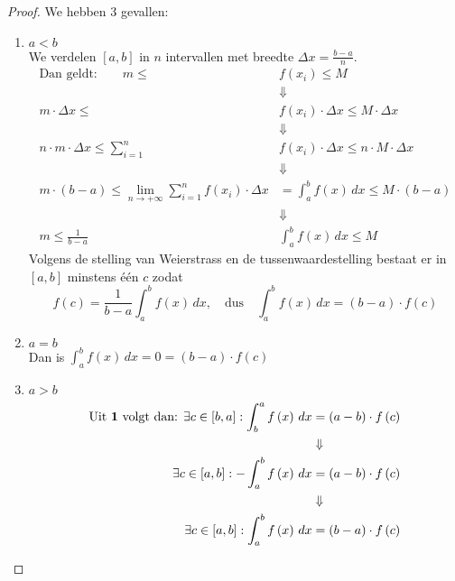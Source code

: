 \documentclass{article}
\theoremstyle{definition}
\begin{document}
\begin{proof}
  We hebben 3 gevallen:
  \begin{enumerate}
    \item $\boxed{a<b}$\\
      We verdelen $\left[a,b\right]$ in $n$ intervallen met breedte $\Delta x = \frac{b-a}{n}$.\\
      \begin{align*}
        \text{Dan geldt:}\qquad m\leq &f\left(x_i\right) \leq M\\
                          &\Downarrow\\
        m \cdot \Delta x\leq &f\left(x_i\right)\cdot \Delta x \leq M\cdot \Delta x\\ 
                          &\Downarrow\\
        n\cdot m \cdot \Delta x\leq \sum_{i=1}^{n}&f\left(x_i\right)\cdot \Delta x \leq n\cdot M\cdot \Delta x\\
                          &\Downarrow\\
        m\cdot \left(b-a\right)\leq \lim_{n\to + \infty}\sum_{i=1}^{n}f\left(x_i\right)\cdot \Delta x &=\displaystyle\int_{a}^{b}f\left(x\right)\,dx\leq M\cdot \left(b-a\right)\\
                          &\Downarrow\\
        m\leq\frac{1}{b-a}&\displaystyle\int_{a}^{b}f\left(x\right)\,dx\leq M
      \end{align*}
      Volgens de stelling van Weierstrass en de tussenwaardestelling bestaat er in $\left[a,b\right]$ minstens één $c$ zodat
      $$f\left(c\right)=\frac{1}{b-a}\displaystyle\int_{a}^{b}f\left(x\right)\,dx, \quad \text{dus} \quad  \displaystyle\int_{a}^{b}f\left(x\right)\,dx=\left(b-a\right)\cdot f\left(c\right)$$
    \item $\boxed{a=b}$\\
      Dan is $\displaystyle\int_{a}^{b}f\left(x\right)\, dx= 0 = \left(b-a\right)\cdot f\left(c\right)$
    \item $\boxed{a>b}$\\
      \begin{align*}
        \text{Uit \textbf{1} volgt dan: } \exists c\in \left[b,a\right]: \displaystyle\int_{b}^{a}f\left(x\right)\,dx &= \left(a-b\right)\cdot f\left(c\right)\\
                                                                                                                       &\Downarrow\\
         \exists c\in \left[a,b\right]: -\displaystyle\int_{a}^{b}f\left(x\right)\,dx &= \left(a-b\right)\cdot f\left(c\right)\\
                                                                                                                       &\Downarrow\\
         \exists c\in \left[a,b\right]: \displaystyle\int_{a}^{b}f\left(x\right)\,dx &= \left(b-a\right)\cdot f\left(c\right)\\
      \end{align*}
  \end{enumerate}
\end{proof}
\end{document}
